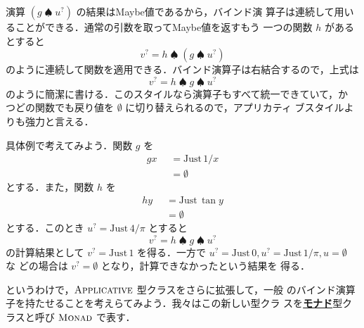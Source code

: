 \documentclass[a5paper,twoside,fleqn,draft]{jsbook}
\newcommand{\keyword}[1]{{\underline{\textbf{#1}}}}
\newcommand{\mKeyword}[1]{\mathsf{#1}}
\newcommand{\mOtherwiseKeyword}{\mKeyword{otherwise}}
\DeclareMathOperator{\mOtherwise}{\mOtherwiseKeyword}
\newcommand{\mNothing}{\emptyset}
\DeclareMathOperator{\mBindMaybe}{\spadesuit}
\newcommand{\mValueConstructor}[1]{\mathrm{#1}}
\newcommand{\mValueWith}[2]{\mValueConstructor{#1}\,#2}
\newcommand{\mJustWith}[1]{\mValueWith{Just}{#1}}
\newcommand{\mTypeClass}[1]{\textsc{#1}} %
\newcommand{\mApplicativeTypeClass}{\mTypeClass{Applicative}}
\newcommand{\mMonadTypeClass}{\mTypeClass{Monad}}
\newcommand{\mMaybe}[1]{{#1}^?}
\newcommand{\mGuard}[1]{\mathop{\mid_{#1}}}
\begin{document}
演算 $(g\mBindMaybe\mMaybe{u})$ の結果はMaybe値であるから，バインド演
算子は連続して用いることができる．通常の引数を取ってMaybe値を返すもう
一つの関数 $h$ があるとすると
\begin{equation}
  \mMaybe{v}=h\mBindMaybe{}(g\mBindMaybe\mMaybe{u})
\end{equation}
のように連続して関数を適用できる．バインド演算子は右結合するので，上式は
\begin{equation}
  \label{eq:maybe-z-bind-style}
  \mMaybe{v}=h\mBindMaybe g\mBindMaybe\mMaybe{u}
\end{equation}
のように簡潔に書ける．このスタイルなら演算子もすべて統一できていて，か
つどの関数でも戻り値を $\mNothing$ に切り替えられるので，アプリカティ
ブスタイルよりも強力と言える．

具体例で考えてみよう．関数 $g$ を
\begin{equation}
  \begin{aligned}
    gx&\mGuard{x\neq0}=\mJustWith{1/x}\\
    &\mGuard{\mOtherwise}=\mNothing
  \end{aligned}
\end{equation}
とする．また，関数 $h$ を
\begin{equation}
  \begin{aligned}
    hy&\mGuard{-\frac{\pi}{2}<y<\frac{\pi}{2}}=\mJustWith{\tan y}\\
    &\mGuard{\mOtherwise}=\mNothing
  \end{aligned}
\end{equation}
とする．このとき $\mMaybe{u}=\mJustWith{4/\pi}$ とすると
\begin{equation}
\mMaybe{v}=h\mBindMaybe g\mBindMaybe\mMaybe{u}
\end{equation}
の計算結果として $\mMaybe{v}=\mJustWith{1}$ を得る．一方で
$\mMaybe{u}=\mJustWith{0},\mMaybe{u}=\mJustWith{1/\pi},u=\mNothing$ な
どの場合は $\mMaybe{v}=\mNothing$ となり，計算できなかったという結果を
得る．


というわけで，$\mApplicativeTypeClass$ 型クラスをさらに拡張して，一般
のバインド演算子を持たせることを考えらてみよう．我々はこの新しい型クラ
スを\keyword{モナド}型クラスと呼び $\mMonadTypeClass$ で表す．
\end{document}
